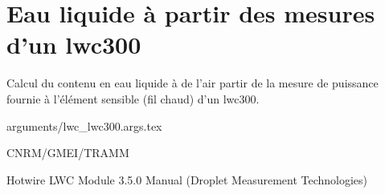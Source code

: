%
\section{Eau liquide \`a partir des mesures d'un lwc300}

 

Calcul du contenu en eau liquide \`a  de l'air
partir de la mesure de puissance fournie \`a 
l'\'el\'ement sensible (fil chaud) d'un lwc300.


\bigskip
 {arguments/lwc_lwc300.args.tex}




CNRM/GMEI/TRAMM

Hotwire LWC Module 3.5.0 Manual (Droplet Measurement Technologies)
